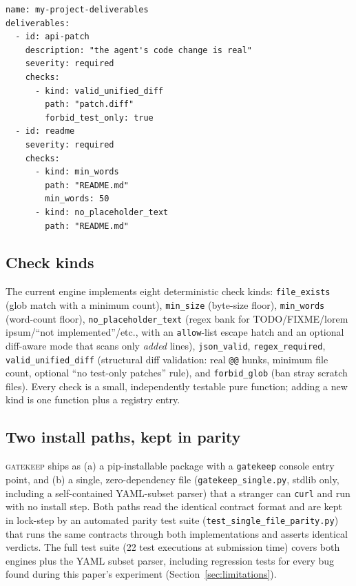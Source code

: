 \documentclass{article}
\begin{document}
\begin{lstlisting}[style=yamlstyle, caption={A deliverable contract.}, label={lst:contract}]
name: my-project-deliverables
deliverables:
  - id: api-patch
    description: "the agent's code change is real"
    severity: required
    checks:
      - kind: valid_unified_diff
        path: "patch.diff"
        forbid_test_only: true
  - id: readme
    severity: required
    checks:
      - kind: min_words
        path: "README.md"
        min_words: 50
      - kind: no_placeholder_text
        path: "README.md"
\end{lstlisting}

\subsection{Check kinds}

The current engine implements eight deterministic check kinds:
\texttt{file\_exists} (glob match with a minimum count),
\texttt{min\_size} (byte-size floor), \texttt{min\_words} (word-count
floor), \texttt{no\_placeholder\_text} (regex bank for TODO/FIXME/lorem
ipsum/``not implemented''/etc., with an \texttt{allow}-list escape hatch
and an optional diff-aware mode that scans only \emph{added} lines),
\texttt{json\_valid}, \texttt{regex\_required}, \texttt{valid\_unified\_diff}
(structural diff validation: real \texttt{@@} hunks, minimum file count,
optional ``no test-only patches'' rule), and \texttt{forbid\_glob} (ban
stray scratch files). Every check is a small, independently testable pure
function; adding a new kind is one function plus a registry entry.

\subsection{Two install paths, kept in parity}

\textsc{gatekeep} ships as (a) a pip-installable package with a
\texttt{gatekeep} console entry point, and (b) a single, zero-dependency
file (\texttt{gatekeep\_single.py}, stdlib only, including a self-contained
YAML-subset parser) that a stranger can \texttt{curl} and run with no
install step. Both paths read the identical contract format and are kept
in lock-step by an automated parity test suite
(\texttt{test\_single\_file\_parity.py}) that runs the same contracts
through both implementations and asserts identical verdicts. The full test
suite (22 test executions at submission time) covers both engines plus the YAML
subset parser, including regression tests for every bug found during this
paper's experiment (Section~\ref{sec:limitations}).
\end{document}
